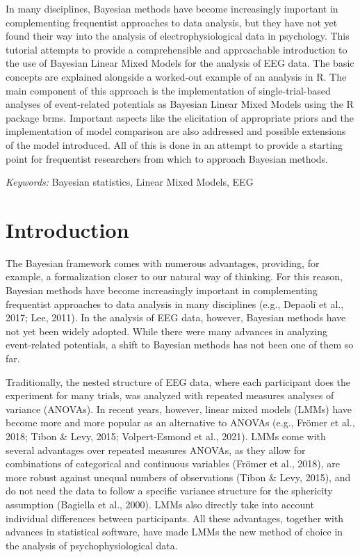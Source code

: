 \documentclass[
  doc,12pt,floatsintext]{apa7}
\begin{document}
\noindent In many disciplines, Bayesian methods have become increasingly important in complementing frequentist approaches to data analysis, but they have not yet found their way into the analysis of electrophysiological data in psychology. This tutorial attempts to provide a comprehensible and approachable introduction to the use of Bayesian Linear Mixed Models for the analysis of EEG data. The basic concepts are explained alongside a worked-out example of an analysis in R. The main component of this approach is the implementation of single-trial-based analyses of event-related potentials as Bayesian Linear Mixed Models using the R package brms. Important aspects like the elicitation of appropriate priors and the implementation of model comparison are also addressed and possible extensions of the model introduced. All of this is done in an attempt to provide a starting point for frequentist researchers from which to approach Bayesian methods.

\emph{Keywords:} Bayesian statistics, Linear Mixed Models, EEG

\clearpage

\mbox{}\thispagestyle{empty}\clearpage

\newpage

\section{Introduction}\label{introduction}

The Bayesian framework comes with numerous advantages, providing, for example, a formalization closer to our natural way of thinking. For this reason, Bayesian methods have become increasingly important in complementing frequentist approaches to data analysis in many disciplines (e.g., Depaoli et al., 2017; Lee, 2011). In the analysis of EEG data, however, Bayesian methods have not yet been widely adopted. While there were many advances in analyzing event-related potentials, a shift to Bayesian methods has not been one of them so far.

Traditionally, the nested structure of EEG data, where each participant does the experiment for many trials, was analyzed with repeated measures analyses of variance (ANOVAs). In recent years, however, linear mixed models (LMMs) have become more and more popular as an alternative to ANOVAs (e.g., Frömer et al., 2018; Tibon \& Levy, 2015; Volpert-Esmond et al., 2021). LMMs come with several advantages over repeated measures ANOVAs, as they allow for combinations of categorical and continuous variables (Frömer et al., 2018), are more robust against unequal numbers of observations (Tibon \& Levy, 2015), and do not need the data to follow a specific variance structure for the sphericity assumption (Bagiella et al., 2000). LMMs also directly take into account individual differences between participants. All these advantages, together with advances in statistical software, have made LMMs the new method of choice in the analysis of psychophysiological data.
\end{document}
